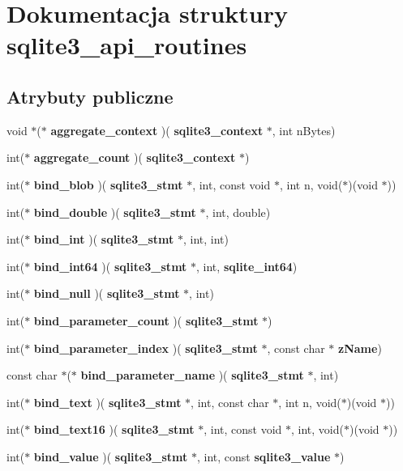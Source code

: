 \section{Dokumentacja struktury sqlite3\+\_\+api\+\_\+routines}
\label{structsqlite3__api__routines}
\subsection*{Atrybuty publiczne}
\begin{DoxyCompactItemize}
\item 
void $\ast$($\ast$ \textbf{ aggregate\+\_\+context} )(\textbf{ sqlite3\+\_\+context} $\ast$, int n\+Bytes)
\item 
int($\ast$ \textbf{ aggregate\+\_\+count} )(\textbf{ sqlite3\+\_\+context} $\ast$)
\item 
int($\ast$ \textbf{ bind\+\_\+blob} )(\textbf{ sqlite3\+\_\+stmt} $\ast$, int, const void $\ast$, int n, void($\ast$)(void $\ast$))
\item 
int($\ast$ \textbf{ bind\+\_\+double} )(\textbf{ sqlite3\+\_\+stmt} $\ast$, int, double)
\item 
int($\ast$ \textbf{ bind\+\_\+int} )(\textbf{ sqlite3\+\_\+stmt} $\ast$, int, int)
\item 
int($\ast$ \textbf{ bind\+\_\+int64} )(\textbf{ sqlite3\+\_\+stmt} $\ast$, int, \textbf{ sqlite\+\_\+int64})
\item 
int($\ast$ \textbf{ bind\+\_\+null} )(\textbf{ sqlite3\+\_\+stmt} $\ast$, int)
\item 
int($\ast$ \textbf{ bind\+\_\+parameter\+\_\+count} )(\textbf{ sqlite3\+\_\+stmt} $\ast$)
\item 
int($\ast$ \textbf{ bind\+\_\+parameter\+\_\+index} )(\textbf{ sqlite3\+\_\+stmt} $\ast$, const char $\ast$\textbf{ z\+Name})
\item 
const char $\ast$($\ast$ \textbf{ bind\+\_\+parameter\+\_\+name} )(\textbf{ sqlite3\+\_\+stmt} $\ast$, int)
\item 
int($\ast$ \textbf{ bind\+\_\+text} )(\textbf{ sqlite3\+\_\+stmt} $\ast$, int, const char $\ast$, int n, void($\ast$)(void $\ast$))
\item 
int($\ast$ \textbf{ bind\+\_\+text16} )(\textbf{ sqlite3\+\_\+stmt} $\ast$, int, const void $\ast$, int, void($\ast$)(void $\ast$))
\item 
int($\ast$ \textbf{ bind\+\_\+value} )(\textbf{ sqlite3\+\_\+stmt} $\ast$, int, const \textbf{ sqlite3\+\_\+value} $\ast$)
\item 

\end{DoxyCompactItemize}
